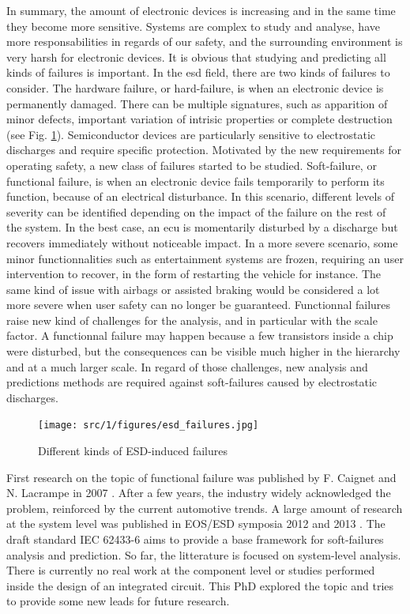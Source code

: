 In summary, the amount of electronic devices is increasing and in the same time they become more sensitive.
Systems are complex to study and analyse, have more responsabilities in regards of our safety, and the surrounding environment is very harsh for electronic devices.
It is obvious that studying and predicting all kinds of failures is important.
In the \gls{esd} field, there are two kinds of failures to consider.
The hardware failure, or hard-failure, is when an electronic device is permanently damaged.
There can be multiple signatures, such as apparition of minor defects, important variation of intrisic properties or complete destruction (see Fig. \ref{fig:esd-failures}).
Semiconductor devices are particularly sensitive to electrostatic discharges \cite{impactESDsemiconductors} and require specific protection.
Motivated by the new requirements for operating safety, a new class of failures started to be studied.
Soft-failure, or functional failure, is when an electronic device fails temporarily to perform its function, because of an electrical disturbance.
In this scenario, different levels of severity can be identified depending on the impact of the failure on the rest of the system.
In the best case, an \gls{ecu} is momentarily disturbed by a discharge but recovers immediately without noticeable impact.
In a more severe scenario, some minor functionnalities such as entertainment systems are frozen, requiring an user intervention to recover, in the form of restarting the vehicle for instance.
The same kind of issue with airbags or assisted braking would be considered a lot more severe when user safety can no longer be guaranteed.
Functionnal failures raise new kind of challenges for the analysis, and in particular with the scale factor.
A functionnal failure may happen because a few transistors inside a chip were disturbed, but the consequences can be visible much higher in the hierarchy and at a much larger scale.
In regard of those challenges, new analysis and predictions methods are required against soft-failures caused by electrostatic discharges.

\begin{figure}[!h]
  \centering
  \texttt{[image: src/1/figures/esd\_failures.jpg]}
  \caption{Different kinds of ESD-induced failures}
  \label{fig:esd-failures}
\end{figure}


First research on the topic of functional failure was published by F. Caignet and N. Lacrampe in 2007 \cite{}.
After a few years, the industry widely acknowledged the problem, reinforced by the current automotive trends.
A large amount of research at the system level was published in EOS/ESD symposia 2012 \cite{} and 2013 \cite{}.
The draft standard IEC 62433-6 aims to provide a base framework for soft-failures analysis and prediction.
So far, the litterature is focused on system-level analysis.
There is currently no real work at the component level or studies performed inside the design of an integrated circuit.
This PhD explored the topic and tries to provide some new leads for future research.

